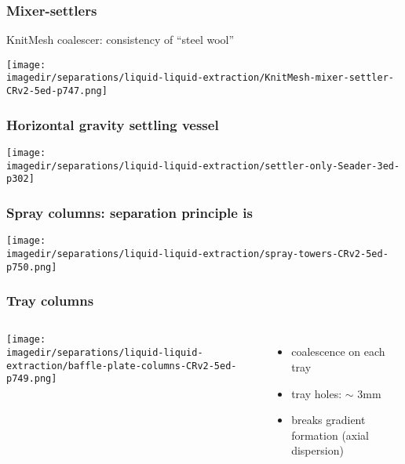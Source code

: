 \begin{frame}\frametitle{Mixer-settlers}
	KnitMesh coalescer: consistency of ``steel wool''
	\begin{center}
		\texttt{[image: \\imagedir/separations/liquid-liquid-extraction/KnitMesh-mixer-settler-CRv2-5ed-p747.png]}
	\end{center}
\end{frame}

\begin{frame}\frametitle{Horizontal gravity settling vessel}
	\begin{center}
		\texttt{[image: \\imagedir/separations/liquid-liquid-extraction/settler-only-Seader-3ed-p302]}
	\end{center}
\end{frame}

\begin{frame}\frametitle{Spray columns: separation principle is {\color{myRed}{gravity}}}
	\begin{center}
		\texttt{[image: \\imagedir/separations/liquid-liquid-extraction/spray-towers-CRv2-5ed-p750.png]}
	\end{center}
	\vspace{-14pt}
	
\end{frame}

\begin{frame}\frametitle{Tray columns}
	\begin{columns}[t]
			\vspace{-0.5cm}
			\begin{center}
				\texttt{[image: \\imagedir/separations/liquid-liquid-extraction/baffle-plate-columns-CRv2-5ed-p749.png]}
			\end{center}
			\vspace{-20pt}
			\begin{itemize}
				\item	coalescence on each tray
				\item	tray holes: $\sim$ 3mm
				\item	breaks gradient formation (axial dispersion)
			\end{itemize}
	\end{columns}
\end{frame}

